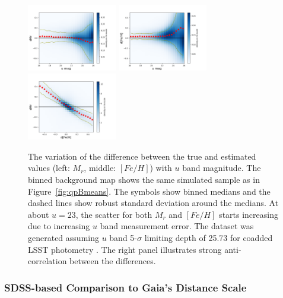 \begin{figure}[h]
\hskip 0.05in
\includegraphics[width=0.35\textwidth,angle=0]{figures/dMrVSumag_SDSSpatchRA340-350-simLSST.png}
\hskip -0.12in
\includegraphics[width=0.35\textwidth,angle=0]{figures/dFeHVSumag_SDSSpatchRA340-350-simLSST.png} 
\hskip -0.12in
\includegraphics[width=0.35\textwidth,angle=0]{figures/dMrVSdFeH_SDSSpatchRA340-350-simLSST.png} 
\caption{The variation of the difference between the true and estimated values (left: $M_r$, middle: $[Fe/H]$) with $u$
  band magnitude. The binned background map shows the same simulated sample as in Figure~\ref{fig:qpBmeans}. 
  The symbols show binned medians and the dashed lines show robust standard deviation around the medians.
  At about $u=23$, the scatter for both $M_r$ and $[Fe/H]$ starts
  increasing due to increasing $u$ band measurement error. The dataset
  was generated assuming $u$ band 5-$\sigma$ limiting depth of 25.73
  for coadded LSST photometry  \citep{2022ApJS..258....1B}. 
  The right panel illustrates strong anti-correlation between the differences. 
\label{fig:perfVSestParams}}
\end{figure}




\subsubsection{SDSS-based Comparison to Gaia's Distance Scale \label{sec:SDSSGaia}} 




